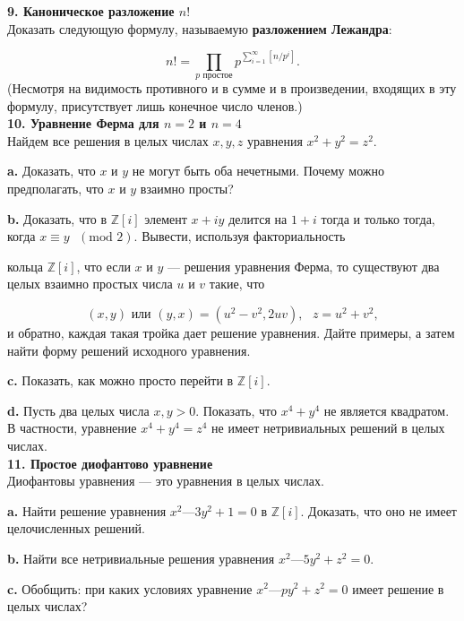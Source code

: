 \noindent \textbf{9. Каноническое разложение $n!$}
\\

Доказать следующую формулу, называемую \textbf{разложением Лежандра}:

\[
n! = \prod_{p \text{ простое}} p^{\sum_{i=1}^\infty[n/p^i]}.
\]
(Несмотря на видимость противного и в сумме и в произведении, 
входящих в эту формулу, присутствует лишь конечное число членов.)
\\

\noindent \textbf{10. Уравнение Ферма для $n = 2$ и $n = 4$}
\\

Найдем все решения в целых числах $x, y, z$ уравнения $x^2 + y^2 = z^2$.

\textbf{a.} Доказать, что $x$ и $y$ не могут быть оба нечетными. Почему можно
предполагать, что $x$ и $y$ взаимно просты?

\textbf{b.} Доказать, что в $\mathbb{Z}[i]$ элемент $x + iy$ делится на $1 + i$ тогда и только тогда, когда $x \equiv y \text{ } (\text{mod } 2)$. Вывести, используя факториальность 

\pagebreak

\noindent кольца $\mathbb{Z}[i]$, что если $x$ и $y$ — решения уравнения Ферма, то существуют два целых взаимно простых числа $u$ и $v$ такие, что

\[
(x,y) \text{ или } (y,x) = (u^2-v^2, 2uv), \text{ } z=u^2+v^2,
\]
и обратно, каждая такая тройка дает решение уравнения. Дайте 
примеры, а затем найти форму решений исходного уравнения.

\textbf{c.} Показать, как можно просто перейти в $\mathbb{Z}[i]$.

\textbf{d.} Пусть два целых числа $x, y > 0$. Показать, что $x^4 + y^4$ не является квадратом. В частности, уравнение $x^4 + y^4 = z^4$ не имеет 
нетривиальных решений в целых числах.
\\

\noindent \textbf{11. Простое диофантово уравнение}
\\

Диофантовы уравнения — это уравнения в целых числах.

\textbf{a.} Найти решение уравнения $x^2 — 3 y^2 + 1 = 0$ в $\mathbb{Z}[i]$. Доказать, что оно не имеет целочисленных решений.

\textbf{b.} Найти все нетривиальные решения уравнения $x^2 — 5 y^2 + z^2 = 0$.

\textbf{c.} Обобщить: при каких условиях уравнение $x^2 —py^2 + z^2 = 0$ имеет решение в целых числах?
\\


